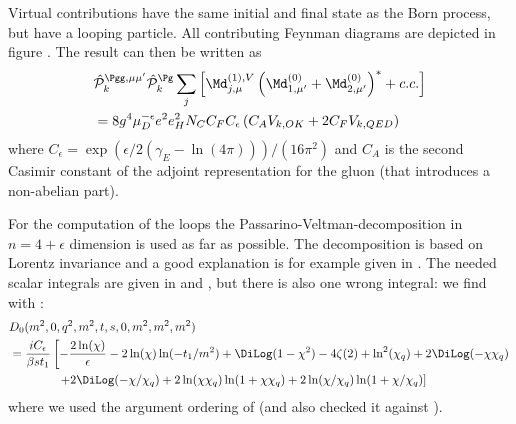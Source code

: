 Virtual contributions have the same initial and final state as the Born process, but have a looping particle. All contributing Feynman diagrams are depicted in figure .
The result can then be written as
\begin{align}
&\hat {\mathcal P}_{k}^{\Pgg,\mu\mu'}\hat {\mathcal P}_{k}^{\Pg}\sum_{j}\left[\Md^{(1),V}_{j,\mu}\left(\Md^{(0)}_{1,\mu'}+\Md^{(0)}_{2,\mu'}\right)^*+c.c.\right] \nonumber\\
 &= 8g^4\mu_D^{-\epsilon}e^2e_H^2 N_C C_FC_\epsilon\left( C_A V_{k,OK} + 2C_F V_{k,QED}\right)
\end{align}
where $C_\epsilon = \exp(\epsilon/2(\gamma_E-\ln(4\pi)))/(16\pi^2)$ and $C_A$ is the second Casimir constant of the adjoint representation for the gluon (that introduces a non-abelian part).

For the computation of the loops the Passarino-Veltman-decomposition\cite{Passarino:1978jh} in $n=4+\epsilon$ dimension is used as far as possible. The decomposition is based on Lorentz invariance and a good explanation is for example given in \cite{Bojak:2000eu}. The needed scalar integrals are given in \cite{PhysRevD4054} and \cite{Laenen1993162}, but there is also one wrong integral: we find with \cite[Box 16]{Ellis:2007qk}:
\begin{align}
&D_0(m^2,0,q^2,m^2,t,s,0,m^2,m^2,m^2)\nonumber\\
 &=\frac{i C_\epsilon}{\beta s t_1}\left[-\frac{2\ln(\chi)}{\epsilon} -2\ln(\chi)\ln(-t_1/m^2)+\DiLog(1-\chi^2)-4\zeta(2)+\ln^2(\chi_q) + 2\DiLog(-\chi\chi_q)\right.\nonumber\\
 &\hspace{40pt}\left. +2\DiLog(-\chi/\chi_q)+2\ln(\chi\chi_q)\ln(1+\chi\chi_q)+2\ln(\chi/\chi_q)\ln(1+\chi/\chi_q)\right]
\end{align}
where we used the argument ordering of \LoopTools\cite{Hahn:1998yk,LoopTools212Guide} (and also checked it against \LoopTools).

